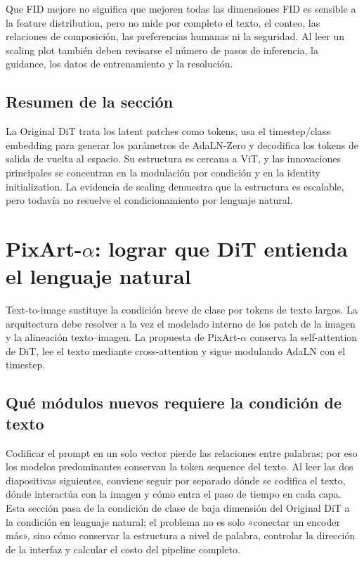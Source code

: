 \documentclass[a4paper]{article}
\begin{document}
\begin{warningbox}{Que FID mejore no significa que mejoren todas las dimensiones}
FID es sensible a la feature distribution, pero no mide por completo el texto, el conteo, las relaciones de composición, las preferencias humanas ni la seguridad. Al leer un scaling plot también deben revisarse el número de pasos de inferencia, la guidance, los datos de entrenamiento y la resolución.
\end{warningbox}

\subsection{Resumen de la sección}

La Original DiT trata los latent patches como tokens, usa el timestep/class embedding para generar los parámetros de AdaLN-Zero y decodifica los tokens de salida de vuelta al espacio. Su estructura es cercana a ViT, y las innovaciones principales se concentran en la modulación por condición y en la identity initialization. La evidencia de scaling demuestra que la estructura es escalable, pero todavía no resuelve el condicionamiento por lenguaje natural.
\section{PixArt-$\alpha$: lograr que DiT entienda el lenguaje natural}

Text-to-image sustituye la condición breve de clase por tokens de texto largos. La arquitectura debe resolver a la vez el modelado interno de los patch de la imagen y la alineación texto--imagen. La propuesta de PixArt-$\alpha$ conserva la self-attention de DiT, lee el texto mediante cross-attention y sigue modulando AdaLN con el timestep.

\subsection{Qué módulos nuevos requiere la condición de texto}

Codificar el prompt en un solo vector pierde las relaciones entre palabras; por eso los modelos predominantes conservan la token sequence del texto. Al leer las dos diapositivas siguientes, conviene seguir por separado dónde se codifica el texto, dónde interactúa con la imagen y cómo entra el paso de tiempo en cada capa. Esta sección pasa de la condición de clase de baja dimensión del Original DiT a la condición en lenguaje natural; el problema no es solo «conectar un encoder más», sino cómo conservar la estructura a nivel de palabra, controlar la dirección de la interfaz y calcular el costo del pipeline completo.
\end{document}
